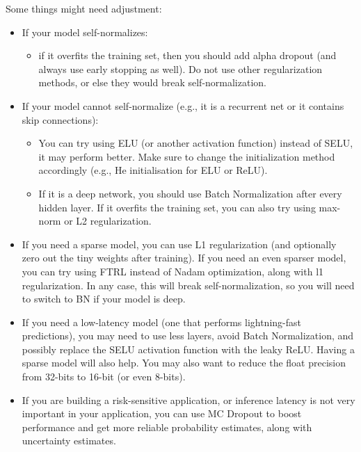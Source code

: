 Some things might need adjustment:
\begin{itemize}
\item If your model self-normalizes:
	\begin{itemize}
		\item if it overfits the training set, then you should add alpha dropout (and always use early stopping as well). Do not use other regularization methods, or else they would break self-normalization.
	\end{itemize}
\item If your model cannot self-normalize (e.g., it is a recurrent net or it contains skip connections):
\begin{itemize}
\item You can try using ELU (or another activation function) instead of SELU, it may perform better. Make sure to change the initialization method accordingly (e.g., He initialisation for ELU or ReLU).
\item If it is a deep network, you should use Batch Normalization after every hidden layer. If it overfits the training set, you can also try using max-norm or L2 regularization.
\end{itemize}
\item If you need a sparse model, you can use L1 regularization (and optionally zero out the tiny weights after training). If you need an even sparser model, you can try using FTRL instead of Nadam optimization, along with l1 regularization. In any case, this will break self-normalization, so you will need to switch to BN if your model is deep.
\item If you need a low-latency model (one that performs lightning-fast predictions), you may need to use less layers, avoid Batch Normalization, and possibly replace the SELU activation function with the leaky ReLU. Having a sparse model will also help. You may also want to reduce the float precision from 32-bits to 16-bit (or even 8-bits).
\item If you are building a risk-sensitive application, or inference latency is not very important in your application, you can use MC Dropout to boost performance and get more reliable probability estimates, along with uncertainty estimates.
\end{itemize}
\printindex
